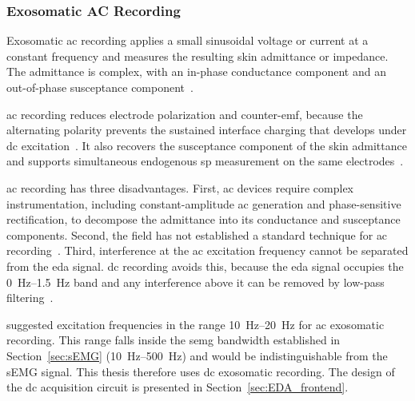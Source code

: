 \subsubsection{Exosomatic AC Recording} \label{sec:EDA_AC}

Exosomatic \gls{ac} recording applies a small sinusoidal voltage or current at a constant frequency and measures the resulting skin admittance or impedance. The admittance is complex, with an in-phase conductance component and an out-of-phase susceptance component~\cite{boucsein_electrodermal_2012, tronstad_current_2022}.

\Gls{ac} recording reduces electrode polarization and counter-\gls{emf}, because the alternating polarity prevents the sustained interface charging that develops under \gls{dc} excitation~\cite{pabst_comparison_2017, posada-quintero_innovations_2020}. It also recovers the susceptance component of the skin admittance and supports simultaneous endogenous \gls{sp} measurement on the same electrodes~\cite{pabst_comparison_2017}.

\Gls{ac} recording has three disadvantages. First, \gls{ac} devices require complex instrumentation, including constant-amplitude \gls{ac} generation and phase-sensitive rectification, to decompose the admittance into its conductance and susceptance components. Second, the field has not established a standard technique for \gls{ac} recording~\cite{boucsein_electrodermal_2012}. Third, interference at the \gls{ac} excitation frequency cannot be separated from the \gls{eda} signal. \gls{dc} recording avoids this, because the \gls{eda} signal occupies the \qtyrange{0}{1.5}{\hertz} band and any interference above it can be removed by low-pass filtering~\cite{boucsein_electrodermal_2012}.


\textcite{martinsen_sources_2015} suggested excitation frequencies in the range \qtyrange{10}{20}{\hertz} for \gls{ac} exosomatic recording. This range falls inside the \gls{semg} bandwidth established in Section~\ref{sec:sEMG} (\qtyrange{10}{500}{\hertz}) and would be indistinguishable from the sEMG signal. This thesis therefore uses \gls{dc} exosomatic recording. The design of the \gls{dc} acquisition circuit is presented in Section~\ref{sec:EDA_frontend}.

